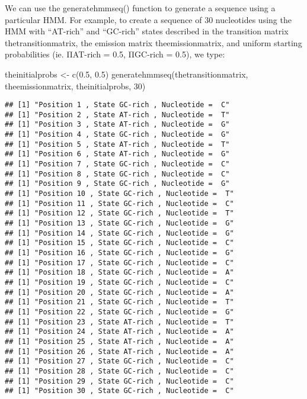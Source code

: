 \documentclass[
]{book}
\newenvironment{Shaded}{\begin{snugshade}}{\end{snugshade}}
\newcommand{\DecValTok}[1]{\textcolor[rgb]{0.00,0.00,0.81}{#1}}
\newcommand{\FloatTok}[1]{\textcolor[rgb]{0.00,0.00,0.81}{#1}}
\newcommand{\FunctionTok}[1]{\textcolor[rgb]{0.00,0.00,0.00}{#1}}
\newcommand{\NormalTok}[1]{#1}
\newcommand{\OtherTok}[1]{\textcolor[rgb]{0.56,0.35,0.01}{#1}}
\begin{document}
We can use the generatehmmseq() function to generate a sequence using a particular HMM. For example, to create a sequence of 30 nucleotides using the HMM with ``AT-rich'' and ``GC-rich'' states described in the transition matrix thetransitionmatrix, the emission matrix theemissionmatrix, and uniform starting probabilities (ie. ΠAT-rich = 0.5, ΠGC-rich = 0.5), we type:

\begin{Shaded}
\begin{Highlighting}[]
\NormalTok{theinitialprobs }\OtherTok{\textless{}{-}} \FunctionTok{c}\NormalTok{(}\FloatTok{0.5}\NormalTok{, }\FloatTok{0.5}\NormalTok{)}
\FunctionTok{generatehmmseq}\NormalTok{(thetransitionmatrix, theemissionmatrix, theinitialprobs, }\DecValTok{30}\NormalTok{)}
\end{Highlighting}
\end{Shaded}

\begin{verbatim}
## [1] "Position 1 , State GC-rich , Nucleotide =  C"
## [1] "Position 2 , State AT-rich , Nucleotide =  T"
## [1] "Position 3 , State AT-rich , Nucleotide =  G"
## [1] "Position 4 , State GC-rich , Nucleotide =  G"
## [1] "Position 5 , State AT-rich , Nucleotide =  T"
## [1] "Position 6 , State AT-rich , Nucleotide =  G"
## [1] "Position 7 , State GC-rich , Nucleotide =  C"
## [1] "Position 8 , State GC-rich , Nucleotide =  C"
## [1] "Position 9 , State GC-rich , Nucleotide =  G"
## [1] "Position 10 , State GC-rich , Nucleotide =  T"
## [1] "Position 11 , State GC-rich , Nucleotide =  C"
## [1] "Position 12 , State GC-rich , Nucleotide =  T"
## [1] "Position 13 , State GC-rich , Nucleotide =  G"
## [1] "Position 14 , State GC-rich , Nucleotide =  G"
## [1] "Position 15 , State GC-rich , Nucleotide =  C"
## [1] "Position 16 , State GC-rich , Nucleotide =  G"
## [1] "Position 17 , State GC-rich , Nucleotide =  C"
## [1] "Position 18 , State GC-rich , Nucleotide =  A"
## [1] "Position 19 , State GC-rich , Nucleotide =  C"
## [1] "Position 20 , State GC-rich , Nucleotide =  A"
## [1] "Position 21 , State GC-rich , Nucleotide =  T"
## [1] "Position 22 , State GC-rich , Nucleotide =  G"
## [1] "Position 23 , State AT-rich , Nucleotide =  T"
## [1] "Position 24 , State AT-rich , Nucleotide =  A"
## [1] "Position 25 , State AT-rich , Nucleotide =  A"
## [1] "Position 26 , State AT-rich , Nucleotide =  A"
## [1] "Position 27 , State GC-rich , Nucleotide =  C"
## [1] "Position 28 , State GC-rich , Nucleotide =  C"
## [1] "Position 29 , State GC-rich , Nucleotide =  C"
## [1] "Position 30 , State GC-rich , Nucleotide =  C"
\end{verbatim}
\end{document}

